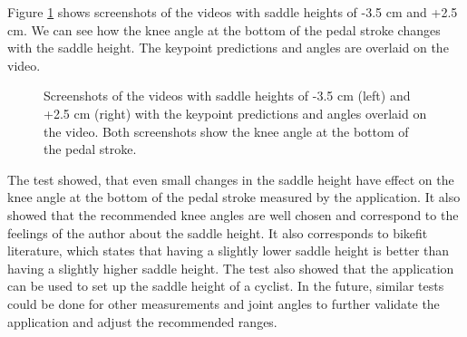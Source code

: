 Figure \ref{fig:saddle_height_setup} shows screenshots of the videos with saddle heights of -3.5 cm and +2.5 cm. We can see how the knee angle at the bottom of the pedal stroke changes with the saddle height. The keypoint predictions and angles are overlaid on the video.

\begin{figure}[htbp]
    \hfill
    \caption{Screenshots of the videos with saddle heights of -3.5 cm (left) and +2.5 cm (right) with the keypoint predictions and angles overlaid on the video. Both screenshots show the knee angle at the bottom of the pedal stroke.}
    \label{fig:saddle_height_setup}

\end{figure}

The test showed, that even small changes in the saddle height have effect on the knee angle at the bottom of the pedal stroke measured by the application. It also showed that the recommended knee angles are well chosen and correspond to the feelings of the author about the saddle height. It also corresponds to bikefit literature, which states that having a slightly lower saddle height is better than having a slightly higher saddle height. The test also showed that the application can be used to set up the saddle height of a cyclist. In the future, similar tests could be done for other measurements and joint angles to further validate the application and adjust the recommended ranges.

